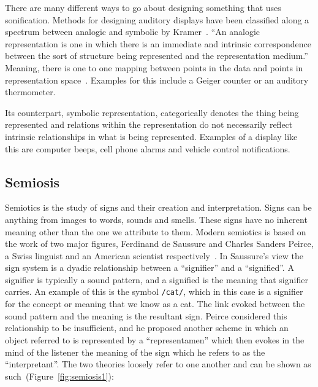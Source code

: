 There are many different ways to go about designing something that uses sonification. Methods for designing auditory displays have been classified along a spectrum between analogic and symbolic by Kramer~\cite*{Barrass1999}.
\enquote{An analogic representation is one in which there is an immediate and intrinsic correspondence between the sort of structure being represented and the representation medium.}
Meaning, there is one to one mapping between points in the data and points in representation space~\cite*{Barrass1999}. 
Examples for this include a Geiger counter or an auditory thermometer.

Its counterpart, symbolic representation, categorically denotes the thing being represented and relations within the representation do not necessarily reflect intrinsic relationships in what is being represented. 
Examples of a display like this are computer beeps, cell phone alarms and vehicle control notifications.


\FloatBarrier
\subsection{Semiosis} %
\label{sub:semiosis}

Semiotics is the study of signs and their creation and interpretation. 
Signs can be anything from images to words, sounds and smells. 
These signs have no inherent meaning other than the one we attribute to them. 
Modern semiotics is based on the work of two major figures, Ferdinand de Saussure and Charles Sanders Peirce, a Swiss linguist and an American scientist respectively~\cite*{Vickers2012}.
In Saussure’s view the sign system is a dyadic relationship between a \enquote{signifier} and a \enquote{signified}.
A signifier is typically a sound pattern, and a signified is the meaning that signifier carries. 
An example of this is the symbol \texttt{/cat/}, which in this case is a signifier for the concept or meaning that we know as a cat. 
The link evoked between the sound pattern and the meaning is the resultant sign. 
Peirce considered this relationship to be insufficient, and he proposed another scheme in which an object referred to is represented by a \enquote{representamen} which then evokes in the mind of the listener the meaning of the sign which he refers to as the \enquote{interpretant}. 
The two theories loosely refer to one another and can be shown as such~\cite*{Vickers2012}(Figure~\ref{fig:semiosis1}):


